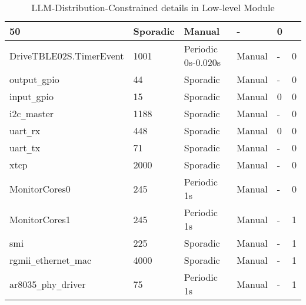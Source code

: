 {\begin{table}[!ht]
{\begin{tabular}{|l|l|l|l|l|l|}
				50 & 
				Sporadic & 
				Manual &
				- &
				0\\
				\hline
				DriveTBLE02S.TimerEvent &
				1001 & 
				Periodic 0s-0.020s & 
				Manual &
				- &
				0\\
				\hline
				output\texttt{\_}gpio &
				44 & 
				Sporadic & 
				Manual &
				- &
				0\\
				\hline
				input\texttt{\_}gpio &
				15 & 
				Sporadic & 
				Manual &
				0 &
				0\\
				\hline
				i2c\texttt{\_}master &
				1188 & 
				Sporadic & 
				Manual &
				- &
				0\\
				\hline
				uart\texttt{\_}rx &
				448 & 
				Sporadic & 
				Manual &
				0 &
				0\\
				\hline
				uart\texttt{\_}tx &
				71 & 
				Sporadic & 
				Manual &
				- &
				0\\
				\hline
				xtcp &
				2000 & 
				Sporadic & 
				Manual &
				- &
				0\\
				\hline
				MonitorCores0 &
				245 & 
				Periodic 1s & 
				Manual &
				- &
				0\\
				\hline
				MonitorCores1 &
				245 & 
				Periodic 1s & 
				Manual &
				- &
				1\\
				\hline
				smi &
				225 & 
				Sporadic & 
				Manual &
				- &
				1\\
				\hline
				rgmii\texttt{\_}ethernet\texttt{\_}mac &
				4000 & 
				Sporadic & 
				Manual &
				- &
				1\\
				\hline
				ar8035\texttt{\_}phy\texttt{\_}driver &
				75 & 
				Periodic 1s & 
				Manual &
				- &
				1\\
				\hline
		\end{tabular}}
		\caption{LLM-Distribution-Constrained details in Low-level Module}
		\label{tbl_LLM_Distribution_Constrained}
	\end{table}
}



